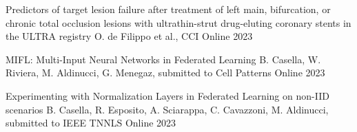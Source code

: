 


\begin{cvhonors}


  \cvhonor
    {Predictors of target lesion failure after treatment of left main, bifurcation, or chronic total occlusion lesions with ultrathin-strut drug-eluting coronary stents in the ULTRA registry} %
    {O. de Filippo et al., CCI} %
    {Online} %
    {2023} %

  \cvhonor
    {MIFL: Multi-Input Neural Networks in Federated Learning} %
    {B. Casella, W. Riviera, M. Aldinucci, G. Menegaz, submitted to Cell Patterns} %
    {Online} %
    {2023} %

  \cvhonor
    {Experimenting with Normalization Layers in Federated Learning on non-IID scenarios} %
    {B. Casella, R. Esposito, A. Sciarappa, C. Cavazzoni, M. Aldinucci, submitted to IEEE TNNLS} %
    {Online} %
    {2023} %

\end{cvhonors}


